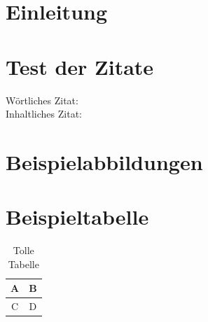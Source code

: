 \documentclass[12pt, ngerman]{article}
\renewcommand{\listoffigures}{\begingroup
	\tocsection
	\tocfile{\listfigurename}{lof}
\endgroup}
\begin{document}


\setcounter{page}{2}

\abstract
\clearpage
\tableofcontents
\clearpage
{}
\section{Einleitung}
\clearpage

\section{Test der Zitate}
Wörtliches Zitat:  \\
Inhaltliches Zitat: 

\section{Beispielabbildungen}

\section{Beispieltabelle}
\begin{table}[h!]
    \centering
    \begin{tabular}{|c|c|}
        A & B \\ \hline
        C & D
    \end{tabular}
    \caption{Tolle Tabelle}
\end{table}


\clearpage
\printbibliography[title=\section{Literaturverzeichnis}]
\listoffigures
\listoftables
\end{document}

